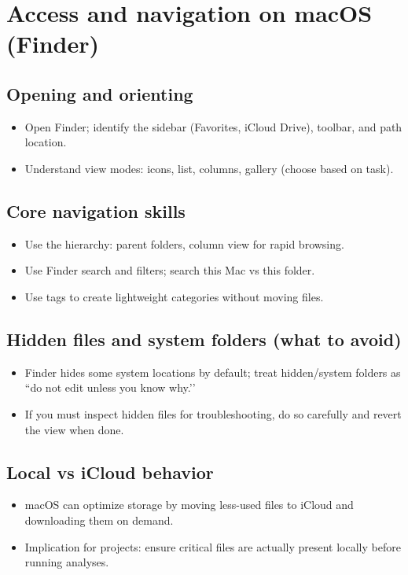\section{Access and navigation on macOS (Finder)}
\subsection{Opening and orienting}
\begin{itemize}
\item Open Finder; identify the sidebar (Favorites, iCloud Drive), toolbar, and path location.
\item Understand view modes: icons, list, columns, gallery (choose based on task).
\end{itemize}

\subsection{Core navigation skills}
\begin{itemize}
\item Use the hierarchy: parent folders, column view for rapid browsing.
\item Use Finder search and filters; search this Mac vs this folder.
\item Use tags to create lightweight categories without moving files.
\end{itemize}

\subsection{Hidden files and system folders (what to avoid)}
\begin{itemize}
\item Finder hides some system locations by default; treat hidden/system folders as ``do not edit unless you know why.’’
\item If you must inspect hidden files for troubleshooting, do so carefully and revert the view when done.
\end{itemize}

\subsection{Local vs iCloud behavior}
\begin{itemize}
\item macOS can optimize storage by moving less-used files to iCloud and downloading them on demand.
\item Implication for projects: ensure critical files are actually present locally before running analyses.
\end{itemize}

